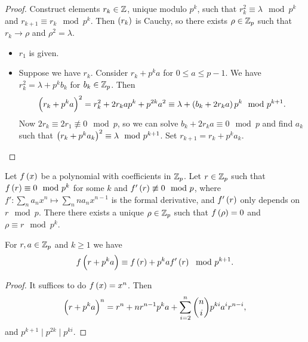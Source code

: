 \begin{proof}
Construct elements $ r_k \in \mathbb{Z} $, unique modulo $ p^k $, such that $ r_k^2 \equiv \lambda \mod p^k $ and $ r_{k + 1} \equiv r_k \mod p^k $. Then $ \br{r_k} $ is Cauchy, so there exists $ \rho \in \mathbb{Z}_p $ such that $ r_k \to \rho $ and $ \rho^2 = \lambda $.
\begin{itemize}
\item $ r_1 $ is given.
\item Suppose we have $ r_k $. Consider $ r_k + p^ka $ for $ 0 \le a \le p - 1 $. We have $ r_k^2 = \lambda + p^kb_k $ for $ b_k \in \mathbb{Z}_p $. Then
$$ \br{r_k + p^ka}^2 = r_k^2 + 2r_kap^k + p^{2k}a^2 \equiv \lambda + \br{b_k + 2r_ka}p^k \mod p^{k + 1}. $$
Now $ 2r_k \equiv 2r_1 \not\equiv 0 \mod p $, so we can solve $ b_k + 2r_ka \equiv 0 \mod p $ and find $ a_k $ such that $ \br{r_k + p^ka_k}^2 \equiv \lambda \mod p^{k + 1} $. Set $ r_{k + 1} = r_k + p^ka_k $.
\end{itemize}
\end{proof}

\begin{proposition}
\label{prop:4.4.7}
Let $ f\br{x} $ be a polynomial with coefficients in $ \mathbb{Z}_p $. Let $ r \in \mathbb{Z}_p $ such that $ f\br{r} \equiv 0 \mod p^k $ for some $ k $ and $ f'\br{r} \not\equiv 0 \mod p $, where $ f' : \sum_n a_nx^n \mapsto \sum_n na_nx^{n - 1} $ is the formal derivative, and $ f'\br{r} $ only depends on $ r \mod p $. There there exists a unique $ \rho \in \mathbb{Z}_p $ such that $ f\br{\rho} = 0 $ and $ \rho \equiv r \mod p^k $.
\end{proposition}

\begin{lemma}
For $ r, a \in \mathbb{Z}_p $ and $ k \ge 1 $ we have
$$ f\br{r + p^ka} \equiv f\br{r} + p^kaf'\br{r} \mod p^{k + 1}. $$
\end{lemma}

\begin{proof}
It suffices to do $ f\br{x} = x^n $. Then
$$ \br{r + p^ka}^n = r^n + nr^{n - 1}p^ka + \sum_{i = 2}^n \binom{n}{i}p^{ki}a^ir^{n - i}, $$
and $ p^{k + 1} \mid p^{2k} \mid p^{ki} $.
\end{proof}


